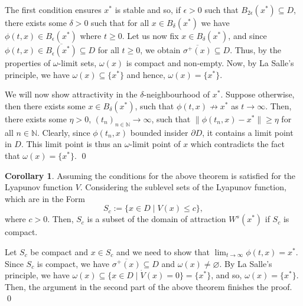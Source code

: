 \documentclass[
]{article}
\theoremstyle{definition}
\newtheorem{corollary}{Corollary}[theorem]
\theoremstyle{definition}
\begin{document}
The first condition ensures \(x^*\) is stable and so, if
\(\epsilon > 0\) such that \(B_{2 \epsilon}(x^*) \subseteq D\), there
exists some \(\delta > 0\) such that for all \(x \in B_\delta(x^*)\) we
have \(\phi(t, x) \in B_\epsilon(x^*)\) where \(t \ge 0\). Let us now
fix \(x \in B_\delta(x^*)\), and since
\(\phi(t, x) \in  \overline{B_\epsilon(x^*)} \subseteq D\) for all
\(t \ge 0\), we obtain \(\overline{\sigma^+(x)} \subseteq D\). Thus, by
the properties of \(\omega\)-limit sets, \(\omega(x)\) is compact and
non-empty. Now, by La Salle's principle, we have
\(\omega(x) \subseteq \{x^*\}\) and hence, \(\omega(x) = \{x^*\}\).

We will now show attractivity in the \(\delta\)-neighbourhood of
\(x^*\). Suppose otherwise, then there exists some
\(x \in B_\delta(x^*)\), such that \(\phi(t, x) \not \to x^*\) as
\(t \to \infty\). Then, there exists some \(\eta > 0\),
\((t_n)_{n \in \mathbb{N}} \to \infty\), such that
\(\|\phi(t_n, x) - x^*\| \ge \eta\) for all \(n \in \mathbb{N}\).
Clearly, since \(\phi(t_n, x)\) bounded insider \(\partial D\), it
contains a limit point in \(D\). This limit point is thus an
\(\omega\)-limit point of \(x\) which contradicts the fact that
\(\omega(x) = \{x^*\}\). \qed

\begin{corollary}
  Assuming the conditions for the above theorem is satisfied for the Lyapunov 
  function \(V\). Considering the sublevel sets of the Lyapunov function, which 
  are in the Form\[S_c := \{x \in D \mid V(x) \le c\},\]
  where \(c > 0\). Then, \(S_c\) is a subset of the domain of attraction \(W^s(x^*)\) 
  if \(S_c\) is compact.
\end{corollary}
\proof

Let \(S_c\) be compact and \(x \in S_c\) and we need to show that
\(\lim_{t \to \infty} \phi(t, x) = x^*\). Since \(S_c\) is compact, we
have \(\overline{\sigma^+(x)} \subseteq D\) and
\(\omega(x) \neq \varnothing\). By La Salle's principle, we have
\(\omega(x) \subseteq \{x \in D \mid \dot V(x) = 0\} = \{x^*\}\), and
so, \(\omega(x) = \{x^*\}\). Then, the argument in the second part of
the above theorem finishes the proof. \qed
\end{document}

